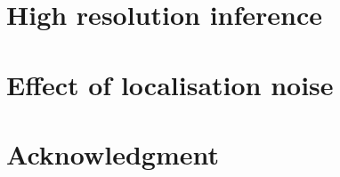 \documentclass[conference]{IEEEtran}
\begin{document}
\section{High resolution inference}


\section{Effect of localisation noise}



\section*{Acknowledgment}\



\end{document}
